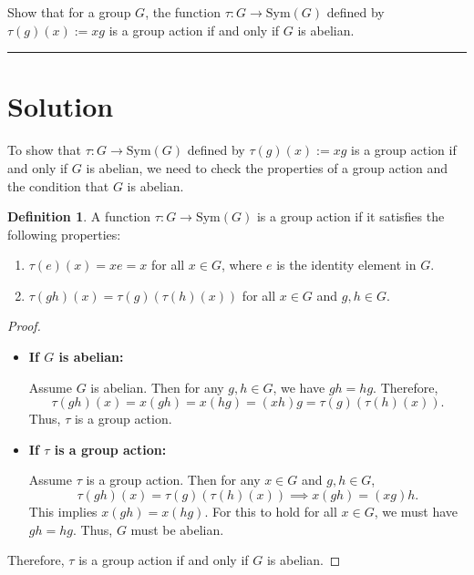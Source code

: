 \documentclass[12pt]{amsart}
\theoremstyle{definition}
\newtheorem{definition}[theorem]{Definition}
\numberwithin{equation}{section}
\begin{document}
\begin{exercise}{4} Show that for a group \(G\), the function \(\tau : G \rightarrow \text{Sym}(G)\) defined by \(\tau(g)(x):= xg\) is a group action if and only if \(G\) is abelian. 

    \noindent\rule{\linewidth}{1pt}
    
    \section*{Solution}
    
    To show that \(\tau : G \rightarrow \text{Sym}(G)\) defined by \(\tau(g)(x) := xg\) is a group action if and only if \(G\) is abelian, we need to check the properties of a group action and the condition that \(G\) is abelian.

    \begin{definition}
        A function \(\tau : G \rightarrow \text{Sym}(G)\) is a group action if it satisfies the following properties:
        \begin{enumerate}
            \item \(\tau(e)(x) = xe = x\) for all \(x \in G\), where \(e\) is the identity element in \(G\).
            \item \(\tau(gh)(x) = \tau(g)(\tau(h)(x))\) for all \(x \in G\) and \(g, h \in G\).
        \end{enumerate}
    \end{definition}

    \begin{proof} \( \)
        \begin{itemize}
            \item \textbf{If \(G\) is abelian:}
            
            Assume \(G\) is abelian. Then for any \(g, h \in G\), we have \(gh = hg\). Therefore,
            \[
            \tau(gh)(x) = x(gh) = x(hg) = (xh)g = \tau(g)(\tau(h)(x)).
            \]
            Thus, \(\tau\) is a group action.

            \item \textbf{If \(\tau\) is a group action:}
            
            Assume \(\tau\) is a group action. Then for any \(x \in G\) and \(g, h \in G\),
            \[
            \tau(gh)(x) = \tau(g)(\tau(h)(x)) \implies x(gh) = (xg)h.
            \]
            This implies \(x(gh) = x(hg)\). For this to hold for all \(x \in G\), we must have \(gh = hg\). Thus, \(G\) must be abelian.
        \end{itemize}

        Therefore, \(\tau\) is a group action if and only if \(G\) is abelian.
    \end{proof}
\end{exercise}
\newpage
\end{document}
